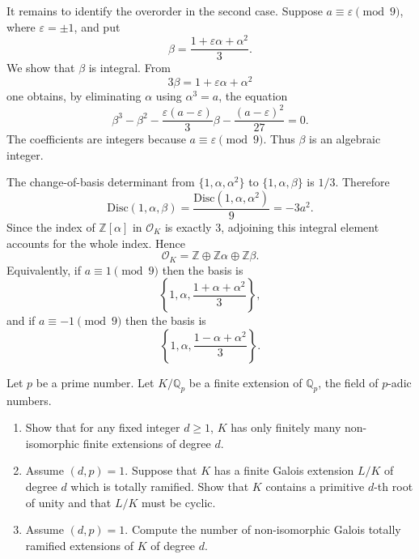 \begin{solution}
It remains to identify the overorder in the second case. Suppose $a\equiv \varepsilon\pmod 9$, where $\varepsilon=\pm 1$, and put
\[
\beta=\frac{1+\varepsilon\alpha+\alpha^2}{3}.
\]
We show that $\beta$ is integral. From
\[
3\beta=1+\varepsilon\alpha+\alpha^2
\]
one obtains, by eliminating $\alpha$ using $\alpha^3=a$, the equation
\[
\beta^3-\beta^2-\frac{\varepsilon(a-\varepsilon)}{3}\beta-\frac{(a-\varepsilon)^2}{27}=0.
\]
The coefficients are integers because $a\equiv \varepsilon\pmod 9$. Thus $\beta$ is an algebraic integer.

The change-of-basis determinant from $\{1,\alpha,\alpha^2\}$ to $\{1,\alpha,\beta\}$ is $1/3$. Therefore
\[
\mathrm{Disc}(1,\alpha,\beta)
=
\frac{\mathrm{Disc}(1,\alpha,\alpha^2)}{9}
=
-3a^2.
\]
Since the index of $\mathbb{Z}[\alpha]$ in $\mathcal{O}_K$ is exactly $3$, adjoining this integral element accounts for the whole index. Hence
\[
\mathcal{O}_K=\mathbb{Z}\oplus \mathbb{Z}\alpha\oplus \mathbb{Z}\beta.
\]
Equivalently, if $a\equiv 1\pmod 9$ then the basis is
\[
\left\{1,\alpha,\frac{1+\alpha+\alpha^2}{3}\right\},
\]
and if $a\equiv -1\pmod 9$ then the basis is
\[
\left\{1,\alpha,\frac{1-\alpha+\alpha^2}{3}\right\}.
\]
\end{solution}

\begin{exercise}
\label{algebra:2026:5}
Let $p$ be a prime number. Let $K/\mathbb{Q}_p$ be a finite extension of $\mathbb{Q}_p$, the field of $p$-adic numbers.
\begin{enumerate}
\item[(1)] Show that for any fixed integer $d\geq 1$, $K$ has only finitely many non-isomorphic finite extensions of degree $d$.
\item[(2)] Assume $(d,p)=1$. Suppose that $K$ has a finite Galois extension $L/K$ of degree $d$ which is totally ramified. Show that $K$ contains a primitive $d$-th root of unity and that $L/K$ must be cyclic.
\item[(3)] Assume $(d,p)=1$. Compute the number of non-isomorphic Galois totally ramified extensions of $K$ of degree $d$.
\end{enumerate}
\end{exercise}

